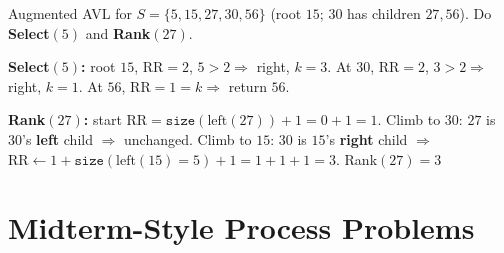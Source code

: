 \documentclass[11pt]{article}
\begin{document}
\begin{exambox}
Augmented AVL for $S=\{5,15,27,30,56\}$ (root $15$; $30$ has children $27, 56$). Do \textbf{Select$(5)$} and \textbf{Rank$(27)$}.

\begin{answerband}
\textbf{Select$(5)$:} root $15$, $\text{RR}=2$, $5>2 \Rightarrow$ right, $k=3$. At $30$, $\text{RR}=2$, $3>2 \Rightarrow$ right, $k=1$. At $56$, $\text{RR}=1=k \Rightarrow$ \textcolor{greenO}{return $56$}.

\textbf{Rank$(27)$:} start $\text{RR}=\texttt{size}(\text{left}(27))+1 = 0+1 = 1$. Climb to $30$: $27$ is $30$'s \textbf{left} child $\Rightarrow$ unchanged. Climb to $15$: $30$ is $15$'s \textbf{right} child $\Rightarrow$ $\text{RR} \leftarrow 1 + \texttt{size}(\text{left}(15){=}5) + 1 = 1+1+1 = 3$. \textcolor{greenO}{Rank$(27)=3$} \checkmark
\end{answerband}
\end{exambox}

\section{Midterm-Style Process Problems}
\end{document}
